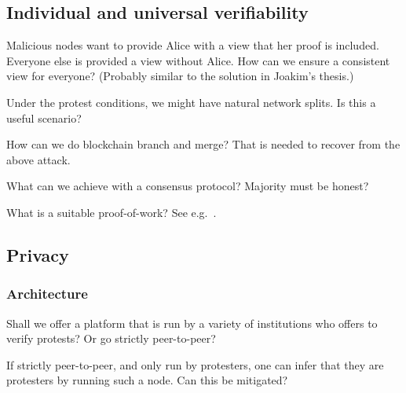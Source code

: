 \subsection{Individual and universal verifiability}

\begin{frame}
  \begin{question}
    Malicious nodes want to provide Alice with a view that her proof is 
    included.
    Everyone else is provided a view without Alice.
    How can we ensure a consistent view for everyone?
    (Probably similar to the solution in Joakim's thesis.)
  \end{question}

  \begin{question}
    Under the protest conditions, we might have natural network splits.
    Is this a useful scenario?
  \end{question}

  \begin{question}
    How can we do blockchain branch and merge?
    That is needed to recover from the above attack.
  \end{question}
\end{frame}

\begin{frame}
  \begin{question}
    What can we achieve with a consensus protocol?
    Majority must be honest?
  \end{question}
  \begin{question}
    What is a suitable proof-of-work?
    See e.g.~\cite{FairProofOfWork}.
  \end{question}
\end{frame}

\subsection{Privacy}

\subsubsection{Architecture}

\begin{frame}
  \begin{question}
    Shall we offer a platform that is run by a variety of institutions who 
    offers to verify protests?
    Or go strictly peer-to-peer?
  \end{question}
  \begin{question}
    If strictly peer-to-peer, and only run by protesters, one can infer that 
    they are protesters by running such a node.
    Can this be mitigated?
  \end{question}
\end{frame}

